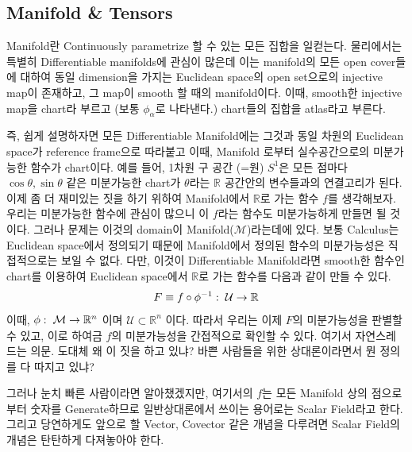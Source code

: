 \documentclass[paper=a4, fontsize=11pt]{scrartcl} %
\numberwithin{equation}{section} %
\numberwithin{figure}{section} %
\numberwithin{table}{section} %
\theoremstyle{plain}
\newcommand{\HS}{\hspace{0.5cm}}
\newcommand{\VS}{\vspace{0.3cm}}
\begin{document}
\subsection{Manifold \& Tensors}

\HS Manifold란 Continuously parametrize 할 수 있는 모든 집합을 일컫는다. 물리에서는 특별히 Differentiable manifolds에 관심이 많은데 이는 manifold의 모든
 open cover들에 대하여 동일 dimension을 가지는 Euclidean space의 open set으로의 injective map이 존재하고, 그 map이 smooth 할 때의 manifold이다.\footnotemark
{}
이때, smooth한 injective map을 chart라 부르고 (보통 $\phi_{\alpha}$로 나타낸다.) chart들의 집합을 atlas라고 부른다.

\VS

\HS 즉, 쉽게 설명하자면 모든 Differentiable Manifold에는 그것과 동일 차원의 Euclidean space가 reference frame으로 따라붙고 이때, Manifold 로부터 실수공간으로의 
미분가능한 함수가 chart이다. 예를 들어, 1차원 구 공간 (=원) $S^1$은 모든 점마다 $\cos \theta, \sin \theta$ 같은 미분가능한 chart가 $\theta$라는 $\mathbb{R}$ 공간안의 변수들과의 연결고리가 된다.
이제 좀 더 재미있는 짓을 하기 위하여 Manifold에서 $\mathbb{R}$로 가는 함수 $f$를 생각해보자. 우리는 미분가능한 함수에 관심이 많으니 이 $f$라는 함수도 미분가능하게 만들면 될 것이다.
그러나 문제는 이것의 domain이 Manifold($\mathcal{M}$)라는데에 있다. 보통 Calculus는 Euclidean space에서 정의되기 때문에 Manifold에서 정의된 함수의 미분가능성은 직접적으로는 보일 수 없다.
다만, 이것이 Differentiable Manifold라면 smooth한 함수인 chart를 이용하여 Euclidean space에서 $\mathbb{R}$로 가는 함수를 다음과 같이 만들 수 있다.
\begin{equation*}
 F \equiv f \circ \phi^{-1} :\hspace{0.1cm} \mathcal{U} \rightarrow \mathbb{R}
\end{equation*}
이때, $\phi:\hspace{0.1cm} \mathcal{M} \rightarrow \mathbb{R}^n$ 이며 $\mathcal{U} \subset \mathbb{R}^n$ 이다. 따라서 우리는 이제 $F$의 미분가능성을 판별할 수 있고, 
이로 하여금 $f$의 미분가능성을 간접적으로 확인할 수 있다. 여기서 자연스레 드는 의문. 도대체 왜 이 짓을 하고 있냐? 바쁜 사람들을 위한 상대론이라면서 뭔 정의를 다 따지고 있냐?

그러나 눈치 빠른 사람이라면 알아챘겠지만, 여기서의 $f$는 모든 Manifold 상의 점으로부터 숫자를 Generate하므로 일반상대론에서 쓰이는 용어로는 Scalar Field라고 한다.
그리고 당연하게도 앞으로 할 Vector, Covector 같은 개념을 다루려면 Scalar Field의 개념은 탄탄하게 다져놓아야 한다.\footnotemark
{}
 
\end{document}
